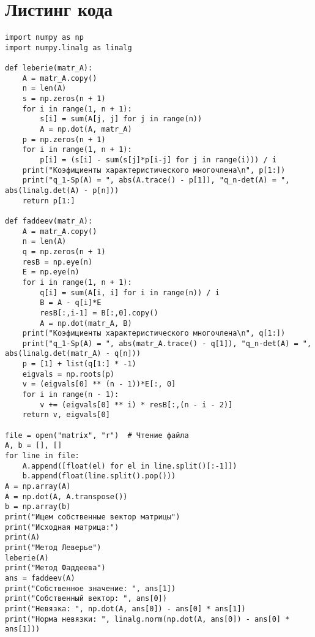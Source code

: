 \documentclass[11.4pt]{article}
\begin{document}
\section{Листинг кода}
\begin{verbatim}
import numpy as np
import numpy.linalg as linalg

def leberie(matr_A):
    A = matr_A.copy()
    n = len(A)
    s = np.zeros(n + 1)
    for i in range(1, n + 1):
        s[i] = sum(A[j, j] for j in range(n))
        A = np.dot(A, matr_A)
    p = np.zeros(n + 1)
    for i in range(1, n + 1):
        p[i] = (s[i] - sum(s[j]*p[i-j] for j in range(i))) / i
    print("Коэфициенты характеристического многочлена\n", p[1:])
    print("q_1-Sp(A) = ", abs(A.trace() - p[1]), "q_n-det(A) = ", abs(linalg.det(A) - p[n]))
    return p[1:]

def faddeev(matr_A):
    A = matr_A.copy()
    n = len(A)
    q = np.zeros(n + 1)
    resB = np.eye(n)
    E = np.eye(n)
    for i in range(1, n + 1):
        q[i] = sum(A[i, i] for i in range(n)) / i
        B = A - q[i]*E
        resB[:,i-1] = B[:,0].copy()
        A = np.dot(matr_A, B)
    print("Коэфициенты характеристического многочлена\n", q[1:])
    print("q_1-Sp(A) = ", abs(matr_A.trace() - q[1]), "q_n-det(A) = ", abs(linalg.det(matr_A) - q[n]))
    p = [1] + list(q[1:] * -1)
    eigvals = np.roots(p)
    v = (eigvals[0] ** (n - 1))*E[:, 0]
    for i in range(n - 1):
        v += (eigvals[0] ** i) * resB[:,(n - i - 2)]
    return v, eigvals[0]

file = open("matrix", "r")  # Чтение файла
A, b = [], []
for line in file:
    A.append([float(el) for el in line.split()[:-1]])
    b.append(float(line.split().pop()))
A = np.array(A)
A = np.dot(A, A.transpose())
b = np.array(b)
print("Ищем собственные вектор матрицы")
print("Исходная матрица:")
print(A)
print("Метод Леверье")
leberie(A)
print("Метод Фаддеева")
ans = faddeev(A)
print("Собственное значение: ", ans[1])
print("Собственный вектор: ", ans[0])
print("Невязка: ", np.dot(A, ans[0]) - ans[0] * ans[1])
print("Норма невязки: ", linalg.norm(np.dot(A, ans[0]) - ans[0] * ans[1]))
\end{verbatim}
\end{document}
